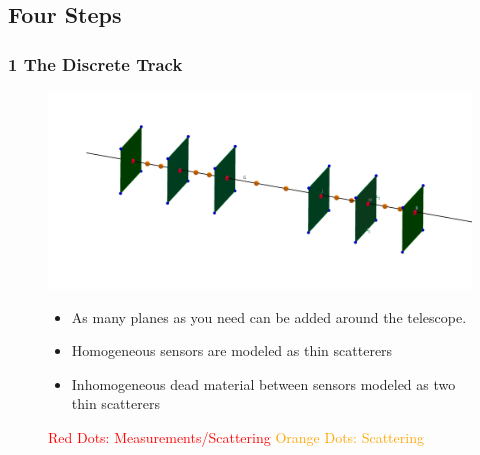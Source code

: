 \documentclass{beamer}
\begin{document}
\subsection{Four Steps}
\begin{frame}
\frametitle{\textbf{1} The Discrete Track}
\begin{figure}
\label{Scat}
\includegraphics[scale=0.50]{pics/meas-scat-jac-link.png}
\caption{
\tiny{
\textcolor{red}{Red Dots: Measurements/Scattering} \textcolor{orange}{Orange Dots: Scattering}
}
}
\begin{itemize}
\item As many planes as you need can be added around the telescope.
\item Homogeneous sensors are modeled as thin scatterers
\item Inhomogeneous dead material between sensors modeled as two thin scatterers 
\end{itemize}

\end{figure}
\end{frame}
\end{document}
